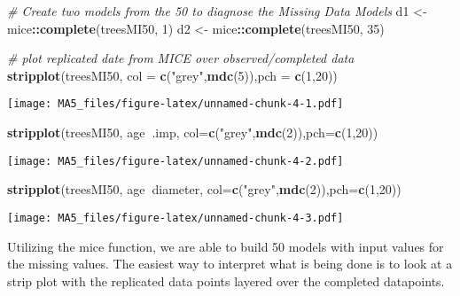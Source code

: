 \documentclass[]{article}
\newenvironment{Shaded}{\begin{snugshade}}{\end{snugshade}}
\newcommand{\KeywordTok}[1]{\textcolor[rgb]{0.13,0.29,0.53}{\textbf{#1}}}
\newcommand{\DataTypeTok}[1]{\textcolor[rgb]{0.13,0.29,0.53}{#1}}
\newcommand{\DecValTok}[1]{\textcolor[rgb]{0.00,0.00,0.81}{#1}}
\newcommand{\StringTok}[1]{\textcolor[rgb]{0.31,0.60,0.02}{#1}}
\newcommand{\CommentTok}[1]{\textcolor[rgb]{0.56,0.35,0.01}{\textit{#1}}}
\newcommand{\OperatorTok}[1]{\textcolor[rgb]{0.81,0.36,0.00}{\textbf{#1}}}
\newcommand{\NormalTok}[1]{#1}
\begin{document}
\begin{Shaded}
\begin{Highlighting}[]
\CommentTok{# Create two models from the 50 to diagnose the Missing Data Models}
\NormalTok{d1 <-}\StringTok{ }\NormalTok{mice}\OperatorTok{::}\KeywordTok{complete}\NormalTok{(treesMI50, }\DecValTok{1}\NormalTok{)}
\NormalTok{d2 <-}\StringTok{ }\NormalTok{mice}\OperatorTok{::}\KeywordTok{complete}\NormalTok{(treesMI50, }\DecValTok{35}\NormalTok{)}

\CommentTok{# plot replicated date from MICE over observed/completed data}
\KeywordTok{stripplot}\NormalTok{(treesMI50, }\DataTypeTok{col =} \KeywordTok{c}\NormalTok{(}\StringTok{"grey"}\NormalTok{,}\KeywordTok{mdc}\NormalTok{(}\DecValTok{5}\NormalTok{)),}\DataTypeTok{pch =} \KeywordTok{c}\NormalTok{(}\DecValTok{1}\NormalTok{,}\DecValTok{20}\NormalTok{))}
\end{Highlighting}
\end{Shaded}

\texttt{[image: MA5\_files/figure-latex/unnamed-chunk-4-1.pdf]}

\begin{Shaded}
\begin{Highlighting}[]
\KeywordTok{stripplot}\NormalTok{(treesMI50, age}\OperatorTok{~}\NormalTok{.imp, }\DataTypeTok{col=}\KeywordTok{c}\NormalTok{(}\StringTok{"grey"}\NormalTok{,}\KeywordTok{mdc}\NormalTok{(}\DecValTok{2}\NormalTok{)),}\DataTypeTok{pch=}\KeywordTok{c}\NormalTok{(}\DecValTok{1}\NormalTok{,}\DecValTok{20}\NormalTok{))}
\end{Highlighting}
\end{Shaded}

\texttt{[image: MA5\_files/figure-latex/unnamed-chunk-4-2.pdf]}

\begin{Shaded}
\begin{Highlighting}[]
\KeywordTok{stripplot}\NormalTok{(treesMI50, age}\OperatorTok{~}\NormalTok{diameter, }\DataTypeTok{col=}\KeywordTok{c}\NormalTok{(}\StringTok{"grey"}\NormalTok{,}\KeywordTok{mdc}\NormalTok{(}\DecValTok{2}\NormalTok{)),}\DataTypeTok{pch=}\KeywordTok{c}\NormalTok{(}\DecValTok{1}\NormalTok{,}\DecValTok{20}\NormalTok{))}
\end{Highlighting}
\end{Shaded}

\texttt{[image: MA5\_files/figure-latex/unnamed-chunk-4-3.pdf]}

Utilizing the mice function, we are able to build 50 models with input
values for the missing values. The easiest way to interpret what is
being done is to look at a strip plot with the replicated data points
layered over the completed datapoints.
\end{document}
